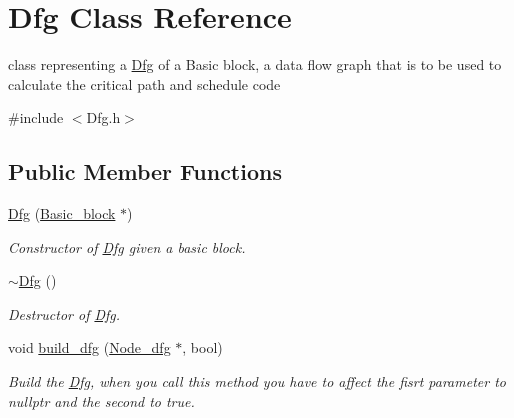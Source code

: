 \hypertarget{class_dfg}{}\section{Dfg Class Reference}
\label{class_dfg}


class representing a \mbox{\hyperlink{class_dfg}{Dfg}} of a Basic block, a data flow graph that is to be used to calculate the critical path and schedule code  




{\ttfamily \#include $<$Dfg.\+h$>$}

\subsection*{Public Member Functions}
\begin{DoxyCompactItemize}
\item 
\mbox{\label{class_dfg_aea8238bc912efa232319120cb1021fc1}} 
\mbox{\hyperlink{class_dfg_aea8238bc912efa232319120cb1021fc1}{Dfg}} (\mbox{\hyperlink{class_basic__block}{Basic\+\_\+block}} $\ast$)
\begin{DoxyCompactList}\small\item\em Constructor of \mbox{\hyperlink{class_dfg}{Dfg}} given a basic block. \end{DoxyCompactList}\item 
\mbox{\label{class_dfg_a1422059d38caedf1ed3897a6f89109d8}} 
\mbox{\hyperlink{class_dfg_a1422059d38caedf1ed3897a6f89109d8}{$\sim$\+Dfg}} ()
\begin{DoxyCompactList}\small\item\em Destructor of \mbox{\hyperlink{class_dfg}{Dfg}}. \end{DoxyCompactList}\item 
\mbox{\label{class_dfg_a32426a0b87ae751c5a43a00629bde5e5}} 
void \mbox{\hyperlink{class_dfg_a32426a0b87ae751c5a43a00629bde5e5}{build\+\_\+dfg}} (\mbox{\hyperlink{class_node__dfg}{Node\+\_\+dfg}} $\ast$, bool)
\begin{DoxyCompactList}\small\item\em Build the \mbox{\hyperlink{class_dfg}{Dfg}}, when you call this method you have to affect the fisrt parameter to nullptr and the second to true. \end{DoxyCompactList}\item 
\mbox{\label{class_dfg_a19e39ead57755ba83008c3938c2b4c5d}} 

\end{DoxyCompactItemize}
